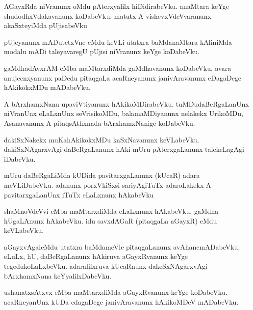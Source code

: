 \documentclass{article}
\begin{document}
\begin{mn}
AGayxRda  niVranunx  oMdu  pAterxyalilx  hiDidirabeVku.  anaMtara  keYge  shudodhxVdakavanunx  koDabeVku.  matutx  A  
vishevxVdeVvaranunx  akaSxteyiMda  pUjisabeVku
\end{mn}

\begin{mn}
pUjeyanunx  mADutetxVne  eMdu  keVLi  utatxra  baMdanaMtara  kAliniMda  modalu  mADi  taleyavaregU  pUjisi  niVranunx  
keYge  koDabeVku.
\end{mn}

\begin{mn}
gaMdhadAvxrAM  eMba  maMtarxdiMda  gaMdhavanunx  koDabeVku.  avara  anujecnxyanunx  paDedu  pitaqgaLa  acaRneyanunx  
janivAravanunx  eDagaDege  hAkikokxMDu  mADabeVku.
\end{mn}

\begin{mn}
A  bArxhamxNanu  upaviVtiyanunx  hAkikoMDirabeVku.  tuMDudaBeRgaLanUnx  niVranUnx  eLaLxnUnx  seVrisikoMDu,  
balamaMDiyanunx  nelakekx  UrikoMDu,  Asanavanunx  A  pitaqsAthxnada   bArxhamxNanige  koDabeVku.
\end{mn}

\begin{mn}
dakiSxNakekx  muKahAkikokxMDu  kaSxNavanunx  keVLabeVku.  dakiSxNAgarxvAgi  daBeRgaLanunx  hAki  mUru  pAterxgaLanunx  
talekeLagAgi  iDabeVku.
\end{mn}

\begin{mn}
mUru  daBeRgaLiMda  kUDida  pavitarxgaLanunx  (kUcaR) adara  meVLiDabeVku.  adanunx  porxVkiSxsi  sariyAgiTuTx  adaroLakekx  
A  pavitarxgaLanUnx  iTuTx  eLaLxnunx  hAkabeVku
\end{mn}

\begin{mn}
shaMnoVdeVvi  eMba  maMtarxdiMda  eLaLxnunx  hAkabeVku.  gaMdha  hUgaLAnunx  hAkabeVku.  idu  savxdAGaR (pitaqgaLa  aGayxR) 
eMdu  keVLabeVku.
\end{mn}

\begin{mn}
aGayxvAgaleMdu  utatxra  baMdameVle  pitaqgaLanunx  avAhanemADabeVku.  eLuLx,  hU,  daBeRgaLanunx  hAkiruva  aGayxRvanunx   
keYge tegedukoLaLxbeVku.  adaralilxruva  kUcaRnunx  dakeSxNAgarxvAgi  bArxhamxNana  keYyalilxDabeVku.
\end{mn}

\begin{mn}
ushanatxsAtxvx  eMba  maMtarxdiMda  aGayxRvanunx  keYge  koDabeVku.  acaRneyanUnx  kUDa  edagaDege  janivAravanunx  
hAkikoMDeV  mADabeVku.
\end{mn}
\end{document}
